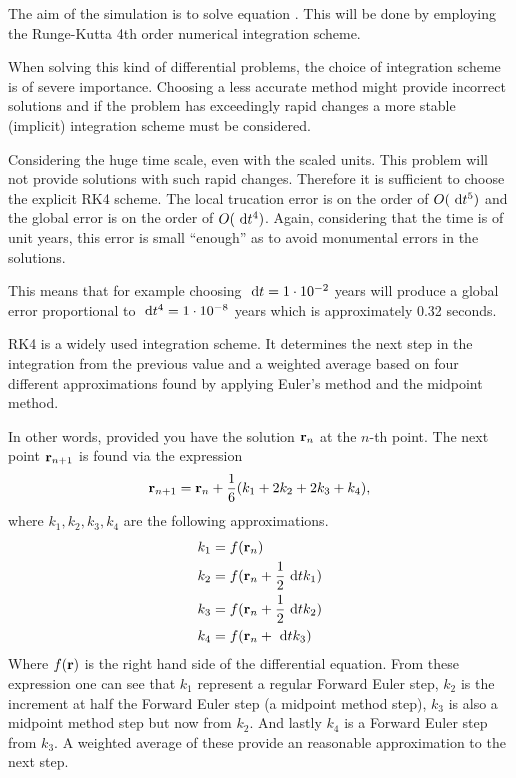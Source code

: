 The aim of the simulation is to solve equation
. This will be done by employing the
Runge-Kutta 4th order numerical integration scheme.

When solving this kind of differential problems, the choice of
integration scheme is of severe importance. Choosing a less
accurate method might provide incorrect solutions and if the
problem has exceedingly rapid changes a more stable (implicit)
integration scheme must be considered.

Considering the huge time scale, even with the scaled units. This
problem will not provide solutions with such rapid changes.
Therefore it is sufficient to choose the explicit RK4 scheme. The
local trucation error is on the order of $O(\ \mathrm{d}t^5)$ and the global
error is on the order of $O(\ \mathrm{d}t^4)$. Again, considering that the
time is of unit years, this error is small ``enough'' as to avoid
monumental errors in the solutions.

This means that for example choosing $\ \mathrm{d}t = 1 \cdot 10^{-2}$ years
will produce a global error proportional to $\ \mathrm{d}t^4 = 1 \cdot
10^{-8}$ years which is approximately 0.32 seconds.

RK4 is a widely used integration scheme. It determines the next
step in the integration from the previous value and a weighted
average based on four different approximations found by applying
Euler's method and the midpoint method.

In other words, provided you have the solution $\mathbf{r}_n$ at the
$n$-th point. The next point $\mathbf{r}_{n+1}$ is found via the expression
\[ \mathbf{r}_{n+1} = \mathbf{r}_n + \frac{1}{6}(k_1 + 2k_2 + 2k_3 + k_4), \] where 
$k_1,k_2,k_3,k_4$ are the following approximations.
\begin{align*}
    k_1 &= f(\mathbf{r}_n) \\
    k_2 &= f(\mathbf{r}_n + \frac{1}{2}\ \mathrm{d}t k_1) \\
    k_3 &= f(\mathbf{r}_n + \frac{1}{2}\ \mathrm{d}t k_2) \\
    k_4 &= f(\mathbf{r}_n + \ \mathrm{d}t k_3)
\end{align*}
Where $f(\mathbf{r})$ is the right hand side of the differential equation.
From these expression one can see that $k_1$ represent a regular
Forward Euler step, $k_2$ is the increment at half the Forward
Euler step (a midpoint method step), $k_3$ is also a midpoint
method step but now from $k_2$. And lastly $k_4$ is a Forward Euler
step from $k_3$. A weighted average of these provide an reasonable
approximation to the next step.
%

